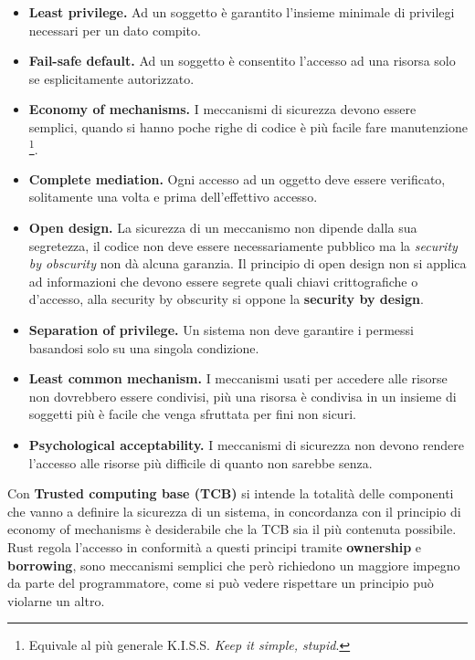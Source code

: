 \documentclass[Lau,binding=0.6cm]{sapthesis}
\begin{document}
\begin{itemize}
	\item \textbf{Least privilege.} Ad un soggetto è garantito l'insieme minimale di privilegi necessari per un dato compito.
	\item \textbf{Fail-safe default.} Ad un soggetto è consentito l'accesso ad una risorsa solo se esplicitamente autorizzato.
	\item \textbf{Economy of mechanisms.} I meccanismi di sicurezza devono essere semplici, quando si hanno poche righe di codice è più facile fare manutenzione \footnote{Equivale al più generale K.I.S.S. \textit{Keep it simple, stupid}.}.
	\item \textbf{Complete mediation.} Ogni accesso ad un oggetto deve essere verificato, solitamente una volta e prima dell'effettivo accesso.
	\item \textbf{Open design.} La sicurezza di un meccanismo non dipende dalla sua segretezza, il codice non deve essere necessariamente pubblico ma la \textit{security by obscurity} non dà alcuna garanzia.
		Il principio di open design non si applica ad informazioni che devono essere segrete quali chiavi crittografiche o d'accesso, alla security by obscurity si oppone la \textbf{security by design}.
	\item \textbf{Separation of privilege.} Un sistema non deve garantire i permessi basandosi solo su una singola condizione.
	\item \textbf{Least common mechanism.} I meccanismi usati per accedere alle risorse non dovrebbero essere condivisi, più una risorsa è condivisa in un insieme di soggetti più è facile che venga sfruttata per fini non sicuri.
	\item \textbf{Psychological acceptability.} I meccanismi di sicurezza non devono rendere l'accesso alle risorse più difficile di quanto non sarebbe senza.
\end{itemize}

Con \textbf{Trusted computing base (TCB)} si intende la totalità delle componenti che vanno a definire la sicurezza di un sistema, in concordanza con il principio di economy of mechanisms è desiderabile che la TCB sia il più contenuta possibile.
Rust regola l'accesso in conformità a questi principi tramite \textbf{ownership} e \textbf{borrowing}, sono meccanismi semplici che però richiedono un maggiore impegno da parte del programmatore, come si può vedere rispettare un principio può violarne un altro.
\end{document}
